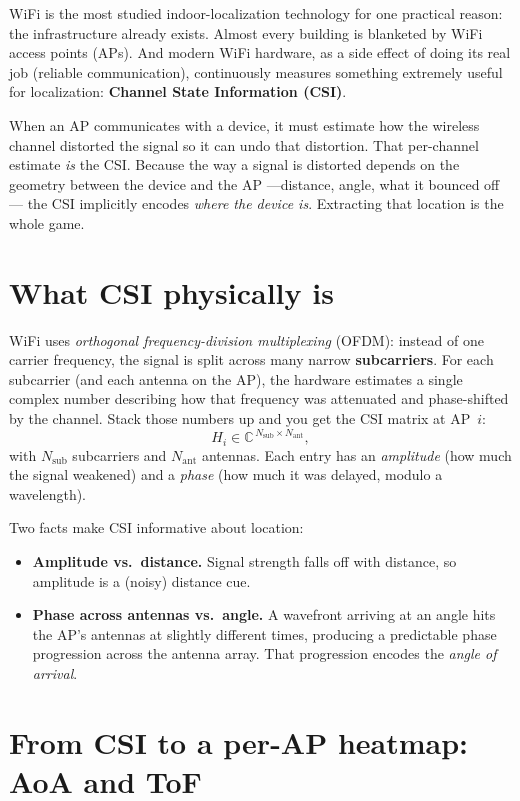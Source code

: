 WiFi is the most studied indoor-localization technology for one practical reason: the infrastructure
already exists. Almost every building is blanketed by WiFi access points (APs). And modern WiFi
hardware, as a side effect of doing its real job (reliable communication), continuously measures
something extremely useful for localization: \textbf{Channel State Information (CSI)}.

When an AP communicates with a device, it must estimate how the wireless channel distorted the
signal so it can undo that distortion. That per-channel estimate \emph{is} the CSI. Because the way a
signal is distorted depends on the geometry between the device and the AP ---distance, angle, what it
bounced off--- the CSI implicitly encodes \emph{where the device is}. Extracting that location is the
whole game.

\section{What CSI physically is}
\label{sec:found:csi}

WiFi uses \emph{orthogonal frequency-division multiplexing} (OFDM): instead of one carrier frequency,
the signal is split across many narrow \textbf{subcarriers}. For each subcarrier (and each antenna on
the AP), the hardware estimates a single complex number describing how that frequency was attenuated
and phase-shifted by the channel. Stack those numbers up and you get the CSI matrix at AP~$i$:
\[
  H_i \in \mathbb{C}^{\,N_{\text{sub}} \times N_{\text{ant}}},
\]
with $N_{\text{sub}}$ subcarriers and $N_{\text{ant}}$ antennas. Each entry has an \emph{amplitude}
(how much the signal weakened) and a \emph{phase} (how much it was delayed, modulo a wavelength).

Two facts make CSI informative about location:
\begin{itemize}[leftmargin=1.4em,nosep]
  \item \textbf{Amplitude vs.\ distance.} Signal strength falls off with distance, so amplitude is a
  (noisy) distance cue.
  \item \textbf{Phase across antennas vs.\ angle.} A wavefront arriving at an angle hits the AP's
  antennas at slightly different times, producing a predictable phase progression across the antenna
  array. That progression encodes the \emph{angle of arrival}.
\end{itemize}

\section{From CSI to a per-AP heatmap: AoA and ToF}
\label{sec:found:aoa}

